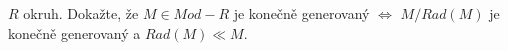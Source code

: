 \documentclass[12pt]{article}					%
\begin{document}

\begin{priklad}
	$R$ okruh. Dokažte, že $M \in Mod{-}R$ je konečně generovaný $\Leftrightarrow$ $M / Rad(M)$ je konečně generovaný a $Rad(M) \ll M$.
\end{priklad}
\end{document}
